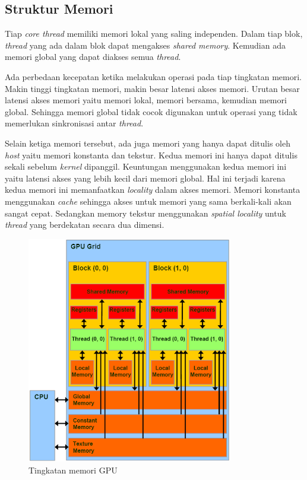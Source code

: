   \subsection{Struktur Memori}
    
    Tiap \emph{core thread} memiliki memori lokal yang saling independen. Dalam tiap blok, \emph{thread} yang ada dalam blok dapat mengakses \emph{shared memory}. Kemudian ada memori global yang dapat diakses semua \emph{thread}. 
    
    Ada perbedaan kecepatan ketika melakukan operasi pada tiap tingkatan memori. Makin tinggi tingkatan memori, makin besar latensi akses memori. Urutan besar latensi akses memori yaitu memori lokal, memori bersama, kemudian memori global. Sehingga memori global tidak cocok digunakan untuk operasi yang tidak memerlukan sinkronisasi antar \emph{thread}. 
    
    Selain ketiga memori tersebut, ada juga memori yang hanya dapat ditulis oleh \emph{host} yaitu memori konstanta dan tekstur. Kedua memori ini hanya dapat ditulis sekali sebelum \emph{kernel} dipanggil. Keuntungan menggunakan kedua memori ini yaitu latensi akses yang lebih kecil dari memori global. Hal ini terjadi karena kedua memori ini memanfaatkan \emph{locality} dalam akses memori. Memori konstanta menggunakan \emph{cache} sehingga akses untuk memori yang sama berkali-kali akan sangat cepat. Sedangkan memory tekstur menggunakan \emph{spatial locality} untuk \emph{thread} yang berdekatan secara dua dimensi.

    \begin{figure}[htb]
      \centering
      \includegraphics[width=0.8\textwidth]{resources/cudamem.png}
      \caption[Tingkatan memori GPU]{Tingkatan memori GPU \citep{cuda}}
    \end{figure}


